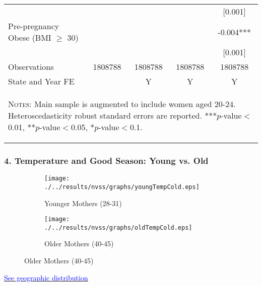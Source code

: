 \documentclass[10pt,letterpaper,subeqn]{beamer}
\begin{document}
\begin{frame}
\begin{table}[htbp]
{\begin{tabular}{l*{4}{c}}
        &               &               &               &     [0.001]   \\
        Pre-pregnancy Obese (BMI $\geq$ 30)&               &               &               &      -0.004***\\
        &               &               &               &     [0.001]   \\
        \midrule
        Observations        &     1808788   &     1808788   &     1808788   &     1808788   \\
        State and Year FE&&Y&Y&Y\\  \bottomrule
        \multicolumn{5}{p{16.4cm}}{\begin{footnotesize}  \textsc{Notes:}  Main sample is augmented to include women aged 20-24. Heteroscedasticity robust standard errors are reported.
            ***$p$-value$<$0.01, **$p$-value$<$0.05, *$p$-value$<$0.1.
  \end{footnotesize}}\end{tabular}}\end{table}
  \end{frame}





\begin{frame}[label=weather]
\frametitle{4. Temperature and Good Season: Young vs. Old}
\begin{figure}[htpb!]
\begin{center}
\label{fig:tempUSA}
\begin{subfigure}{.5\textwidth}
  \centering
  \texttt{[image: ./../results/nvss/graphs/youngTempCold.eps]}
  \caption{Younger Mothers (28-31)}
  \label{fig:tempUSAYoung}
\end{subfigure}%
\begin{subfigure}{.5\textwidth}
  \centering
  \texttt{[image: ./../results/nvss/graphs/oldTempCold.eps]}
  \caption{Older Mothers (40-45)}
  \label{fig:tempUSAOld}
\end{subfigure}
\end{center}
\end{figure}

\vspace{8mm}
\hyperlink{USyoung}{\footnotesize \textcolor{blue}{See geographic distribution}}
\end{frame}
\end{document}
